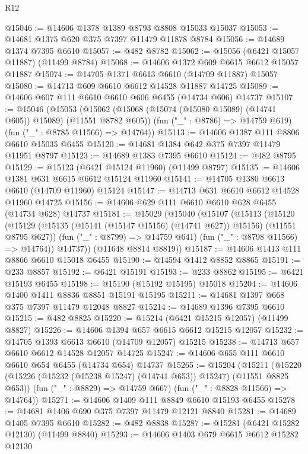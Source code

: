 \begin{lexlean}{R12}
\begin{coremodule}
{{{{{{{{{{{{{{{{{{{{{{{{{{{{{{{{{{{{{{{{{{{{{{{{{{{{{{{{{{{{{{{{{{{{{{{{{{{{{{{{{{@15046 := @14606 @1378 @1389 @8793 @8808 @15033 @15037
@15053 := @14681 @1375 @620 @375 @7397 @11479 @11878 @8784
@15056 := @14689 @1374 @7395 @6610
@15057 := @482 @8782
@15062 := @15056 (@6421 @15057 @11887) (@11499 @8784)
@15068 := @14606 @1372 @609 @6615 @6612 @15057 @11887
@15074 := @14705 @1371 @6613 @6610 (@14709 @11887) @15057
@15080 := @14713 @609 @6610 @6612 @14528 @11887 @14725
@15089 := @14606 @607 @111 @6610 @6610 @606 @6455 (@14734 @606) @14737
@15107 := @15046
    (@15053
      (@15062 (@15068 (@15074 (@15080 @15089) (@14741 @605)) @15089) (@11551 @8782 @605))
      (fun ("_" : @8786) => @14759 @619)
      (fun ("_" : @8785 @11566) => @14764))
@15113 := @14606 @1387 @111 @8806 @6610 @15035 @6455
@15120 := @14681 @1384 @642 @375 @7397 @11479 @11951 @8797
@15123 := @14689 @1383 @7395 @6610
@15124 := @482 @8795
@15129 := @15123 (@6421 @15124 @11960) (@11499 @8797)
@15135 := @14606 @1381 @631 @6615 @6612 @15124 @11960
@15141 := @14705 @1380 @6613 @6610 (@14709 @11960) @15124
@15147 := @14713 @631 @6610 @6612 @14528 @11960 @14725
@15156 := @14606 @629 @111 @6610 @6610 @628 @6455 (@14734 @628) @14737
@15181 := @15029
    (@15040
      (@15107
        (@15113
          (@15120
            (@15129 (@15135 (@15141 (@15147 @15156) (@14741 @627)) @15156) (@11551 @8795 @627))
            (fun ("_" : @8799) => @14759 @641)
            (fun ("_" : @8798 @11566) => @14764))
          @14737))
      (@11648 @8814 @8819))
@15187 := @14606 @1413 @111 @8866 @6610 @15018 @6455
@15190 := @14594 @1412 @8852 @8865
@15191 := @233 @8857
@15192 := @6421 @15191
@15193 := @233 @8862
@15195 := @6421 @15193 @6455
@15198 := @15190 (@15192 @15195) @15018
@15204 := @14606 @1400 @1411 @8836 @8851 @15191 @15195
@15211 := @14681 @1397 @668 @375 @7397 @11479 @12048 @8827
@15214 := @14689 @1396 @7395 @6610
@15215 := @482 @8825
@15220 := @15214 (@6421 @15215 @12057) (@11499 @8827)
@15226 := @14606 @1394 @657 @6615 @6612 @15215 @12057
@15232 := @14705 @1393 @6613 @6610 (@14709 @12057) @15215
@15238 := @14713 @657 @6610 @6612 @14528 @12057 @14725
@15247 := @14606 @655 @111 @6610 @6610 @654 @6455 (@14734 @654) @14737
@15265 := @15204
    (@15211
      (@15220 (@15226 (@15232 (@15238 @15247) (@14741 @653)) @15247) (@11551 @8825 @653))
      (fun ("_" : @8829) => @14759 @667)
      (fun ("_" : @8828 @11566) => @14764))
@15271 := @14606 @1409 @111 @8849 @6610 @15193 @6455
@15278 := @14681 @1406 @690 @375 @7397 @11479 @12121 @8840
@15281 := @14689 @1405 @7395 @6610
@15282 := @482 @8838
@15287 := @15281 (@6421 @15282 @12130) (@11499 @8840)
@15293 := @14606 @1403 @679 @6615 @6612 @15282 @12130
}}}}}}}}}}}}}}}}}}}}}}}}}}}}}}}}}}}}}}}}}}}}}}}}}}}}}}}}}}}}}}}}}}}}}}}}}}}}}}}}}}
\end{coremodule}
\end{lexlean}
